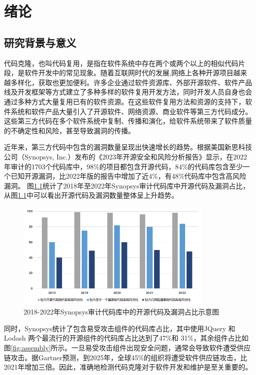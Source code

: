 \chapter{绪论}
\label{chap:intro}

\section{研究背景与意义}
\label{sec:background}
代码克隆，也叫代码复用，是指在软件系统中存在两个或两个以上的相似代码片段\cite{乐乔艺2021代码克隆检测研究进展综述}，是软件开发中的常见现象。随着互联网时代的发展,网络上各种开源项目越来越多样化，获取也更加便利。许多企业通过软件资源库、外部开源软件、软件产品线及开发框架等方式建立了多种多样的软件复用开发方法，同时开发人员自身也会通过多种方式大量复用已有的软件资源。在这些软件复用方法和资源的支持下，软件系统和软件产品大量引入了开源软件、网络资源、商业软件等第三方代码成分。这些第三方代码在多个软件系统中复制、传播和演化，给软件系统带来了软件质量的不确定性和风险，甚至导致漏洞的传播\cite{JSJY20230911009}。

近年来，第三方代码中包含的漏洞数量呈现出快速增长的趋势。根据美国新思科技公司（Synopsys, Inc.）发布的《2023年开源安全和风险分析报告》\cite{Synopsys_2023}显示，在2022年审计的1703个代码库中，98\%的项目都包含开源代码，84\%的代码库包含至少一个已知开源漏洞，比2022年版的报告中增加了近4\%，有48\%代码库中包含高风险漏洞。
图\ref{fig:Proportion}统计了2018年至2022年Synopsys审计代码库中开源代码及漏洞占比，从图\ref{fig:Proportion}中可以看出开源代码及漏洞数量整体呈上升趋势。

\begin{figure}[H]
    \centering
    \includegraphics[width=0.85\textwidth]{figures/Proportion}
    \caption{2018-2022年Synopsys审计代码库中的开源代码及漏洞占比示意图}\label{fig:Proportion}
\end{figure}

同时，Synopsys统计了包含易受攻击组件的代码库占比，其中使用JQuery 和 Lodash 两个最流行的开源组件的代码库占比达到了47\%和 31\%，其余组件占比如图\ref{fig:assembly}所示。一旦易受攻击组件出现安全问题，通常会导致软件遭受供应链攻击。据Gartner\cite{Gartner_2022}预测，到2025年，全球45\%的组织将遭受软件供应链攻击，比2021年增加三倍。因此，准确地检测代码克隆对于软件开发和维护是至关重要的。

